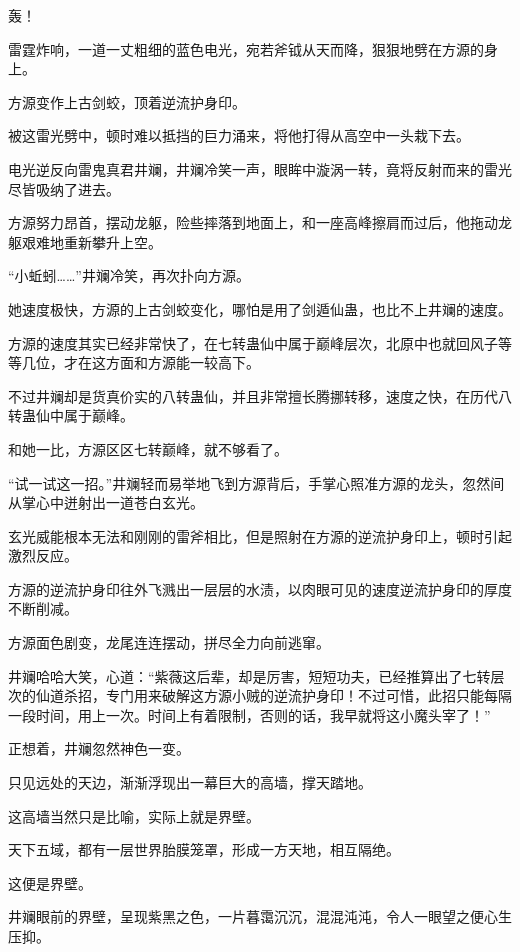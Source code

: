 
\begin{this_body}

轰！

雷霆炸响，一道一丈粗细的蓝色电光，宛若斧钺从天而降，狠狠地劈在方源的身上。

方源变作上古剑蛟，顶着逆流护身印。

被这雷光劈中，顿时难以抵挡的巨力涌来，将他打得从高空中一头栽下去。

电光逆反向雷鬼真君井斓，井斓冷笑一声，眼眸中漩涡一转，竟将反射而来的雷光尽皆吸纳了进去。

方源努力昂首，摆动龙躯，险些摔落到地面上，和一座高峰擦肩而过后，他拖动龙躯艰难地重新攀升上空。

“小蚯蚓……”井斓冷笑，再次扑向方源。

她速度极快，方源的上古剑蛟变化，哪怕是用了剑遁仙蛊，也比不上井斓的速度。

方源的速度其实已经非常快了，在七转蛊仙中属于巅峰层次，北原中也就回风子等等几位，才在这方面和方源能一较高下。

不过井斓却是货真价实的八转蛊仙，并且非常擅长腾挪转移，速度之快，在历代八转蛊仙中属于巅峰。

和她一比，方源区区七转巅峰，就不够看了。

“试一试这一招。”井斓轻而易举地飞到方源背后，手掌心照准方源的龙头，忽然间从掌心中迸射出一道苍白玄光。

玄光威能根本无法和刚刚的雷斧相比，但是照射在方源的逆流护身印上，顿时引起激烈反应。

方源的逆流护身印往外飞溅出一层层的水渍，以肉眼可见的速度逆流护身印的厚度不断削减。

方源面色剧变，龙尾连连摆动，拼尽全力向前逃窜。

井斓哈哈大笑，心道：“紫薇这后辈，却是厉害，短短功夫，已经推算出了七转层次的仙道杀招，专门用来破解这方源小贼的逆流护身印！不过可惜，此招只能每隔一段时间，用上一次。时间上有着限制，否则的话，我早就将这小魔头宰了！”

正想着，井斓忽然神色一变。

只见远处的天边，渐渐浮现出一幕巨大的高墙，撑天踏地。

这高墙当然只是比喻，实际上就是界壁。

天下五域，都有一层世界胎膜笼罩，形成一方天地，相互隔绝。

这便是界壁。

井斓眼前的界壁，呈现紫黑之色，一片暮霭沉沉，混混沌沌，令人一眼望之便心生压抑。


\end{this_body}

